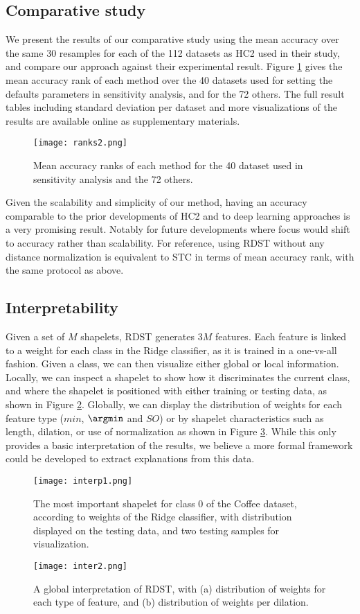 \subsection{Comparative study}
We present the results of our comparative study using the mean accuracy over the same 30 resamples for each of the 112 datasets as HC2 \cite{HC2} used in their study, and compare our approach against their experimental result. Figure \ref{fig:ranksdiv} gives the mean accuracy rank of each method over the 40 datasets used for setting the defaults parameters in sensitivity analysis, and for the 72 others. The full result tables including standard deviation per dataset and more visualizations of the results are available online as supplementary materials. 

\begin{figure}[h]
  \texttt{[image: ranks2.png]}
  \centering
  \caption{Mean accuracy ranks of each method for the 40 dataset used in sensitivity analysis and the 72 others.}
  \label{fig:ranksdiv}
\end{figure}

Given the scalability and simplicity of our method, having an accuracy comparable to the prior developments of HC2 and to deep learning approaches is a very promising result. Notably for future developments where focus would shift to accuracy rather than scalability. For reference, using RDST without any distance normalization is equivalent to STC in terms of mean accuracy rank, with the same protocol as above.

\subsection{Interpretability}
Given a set of $M$ shapelets, RDST generates $3M$ features. Each feature is linked to a weight for each class in the Ridge classifier, as it is trained in a one-vs-all fashion. 
Given a class, we can then visualize either global or local information. Locally, we can inspect a shapelet to show how it discriminates the current class, and where the shapelet is positioned with either training or testing data, as shown in Figure \ref{fig:interp}. Globally, we can display the distribution of weights for each feature type ($min$, $\argmin$ and $SO$) or by shapelet characteristics such as length, dilation, or use of normalization as shown in Figure \ref{fig:interp2}. 
While this only provides a basic interpretation of the results, we believe a more formal framework could be developed to extract explanations from this data.
\begin{figure}[h!]
  \texttt{[image: interp1.png]}
  \centering
  \caption{The most important shapelet for class 0 of the Coffee dataset, according to weights of the Ridge classifier, with distribution displayed on the testing data, and two testing samples for visualization.}
  \label{fig:interp}
\end{figure}
\begin{figure}[h!]
  \texttt{[image: inter2.png]}
  \centering
  \caption{A global interpretation of RDST, with (a) distribution of weights for each type of feature, and (b) distribution of weights per dilation.}
  \label{fig:interp2}
\end{figure}
